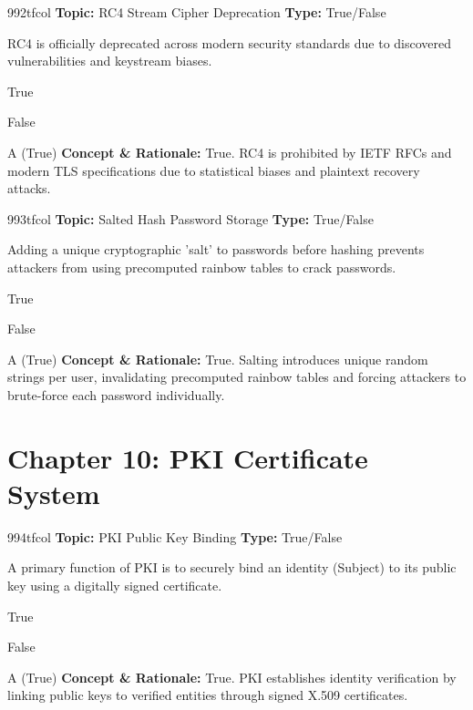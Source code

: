 \begin{qcard}{992}{tfcol}
\textcolor{darkslate!75}{\small\textbf{Topic:} RC4 Stream Cipher Deprecation \hfill \textbf{Type:} True/False}\vspace{0.4em}\par
RC4 is officially deprecated across modern security standards due to discovered vulnerabilities and keystream biases.
\begin{qoptions}
\item True
\item False
\end{qoptions}
\end{qcard}
\nopagebreak
\begin{explainbox}{A (True)}
\textbf{Concept \& Rationale:} True. RC4 is prohibited by IETF RFCs and modern TLS specifications due to statistical biases and plaintext recovery attacks.
\end{explainbox}

\begin{qcard}{993}{tfcol}
\textcolor{darkslate!75}{\small\textbf{Topic:} Salted Hash Password Storage \hfill \textbf{Type:} True/False}\vspace{0.4em}\par
Adding a unique cryptographic 'salt' to passwords before hashing prevents attackers from using precomputed rainbow tables to crack passwords.
\begin{qoptions}
\item True
\item False
\end{qoptions}
\end{qcard}
\nopagebreak
\begin{explainbox}{A (True)}
\textbf{Concept \& Rationale:} True. Salting introduces unique random strings per user, invalidating precomputed rainbow tables and forcing attackers to brute-force each password individually.
\end{explainbox}

\section{Chapter 10: PKI Certificate System}

\begin{qcard}{994}{tfcol}
\textcolor{darkslate!75}{\small\textbf{Topic:} PKI Public Key Binding \hfill \textbf{Type:} True/False}\vspace{0.4em}\par
A primary function of PKI is to securely bind an identity (Subject) to its public key using a digitally signed certificate.
\begin{qoptions}
\item True
\item False
\end{qoptions}
\end{qcard}
\nopagebreak
\begin{explainbox}{A (True)}
\textbf{Concept \& Rationale:} True. PKI establishes identity verification by linking public keys to verified entities through signed X.509 certificates.
\end{explainbox}

